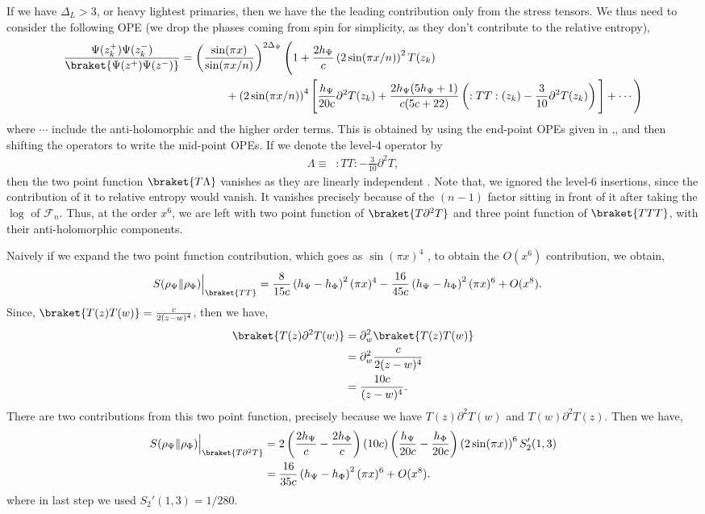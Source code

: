 \documentclass[11pt]{article}
\newcommand{\p}{\partial}
\newcommand{\nn}{\nonumber}
\newcommand{\lb}{\left(}
\newcommand{\rb}{\right)}
\begin{document}
If we have $\Delta_L>3$, or heavy lightest primaries, then we have the the leading contribution only from the stress tensors. We thus need to consider the following OPE (we drop the phases coming from spin for simplicity, as they don't contribute to the relative entropy),
\begin{align}
    \frac{\Psi(z_k^+) \Psi(z_k^-)}{\braket{\Psi(z^+) \Psi(z^-)}} &= \lb\frac{\sin(\pi x)}{\sin(\pi x/n)}\rb^{2\Delta_\Psi} \Bigg(1+ \frac{2h_\Psi}{c} \lb 2\sin (\pi x/n)\rb^2 T(z_k) \nn\\
    &\qquad\qquad  + \lb 2\sin (\pi x/n)\rb^4\Bigg[\frac{h_\Psi}{20c}\p^2T(z_k) + \frac{2h_\Psi(5h_\Psi+1)}{c(5c+22)}\lb :TT:(z_k) - \frac{3}{10}\p^2T(z_k)\rb\Bigg] + \cdots \Bigg)
\end{align}
where $\cdots$ include the anti-holomorphic and the higher order terms. This is obtained by using the end-point OPEs given in \cite{Zamolodchikov:1985wn},\cite{Mathieu_2007}, and then shifting the operators to write the mid-point OPEs. If we denote the level-4 operator by
\begin{align}
    \Lambda  \equiv \,\,\, :TT: - \frac{3}{10}\p^2T,
\end{align}
then the two point function $\braket{T\Lambda}$ vanishes as they are linearly independent \cite{Chen_2014}. Note that, we ignored the level-6 insertions, since the contribution of it to relative entropy would vanish. It vanishes precisely because of the $(n-1)$ factor sitting in front of it after taking the $\log$ of $\mathcal{F}_n$. Thus, at the order $x^6$, we are left with two point function of $\braket{T \p^2 T}$ and three point function of $\braket{TTT}$, with their anti-holomorphic components. 

Naively if we expand the two point function contribution, which goes as $\sin(\pi x)^4$ , to obtain the $O(x^6)$ contribution, we obtain,
\begin{align}
    S(\rho_\Psi \| \rho_\Phi)\Big|_{\braket{TT}}&= \frac{8}{15c}\lb h_\Psi - h_\Phi\rb^2(\pi x)^4 -\frac{16}{45c}\lb h_\Psi - h_\Phi\rb^2(\pi x)^6 + O(x^8).
\end{align}
Since, $\braket{T(z)T(w)} = \frac{c}{2(z-w)^4}$, then we have,
\begin{align}
    \braket{T(z)\p^2T(w)} &= \p^2_w \braket{T(z)T(w)} \\
    &= \p^2_w \frac{c}{2(z-w)^4}\\
    &=\frac{10c}{(z-w)^4}.
\end{align}
There are two contributions from this two point function, precisely because we have $T(z)\p^2T(w)$ and $T(w) \p^2T(z)$. Then we have,
\begin{align}
    S(\rho_\Psi \| \rho_\Phi) \Big|_{\braket{T\p^2T}} &= 2 \lb \frac{2h_\Psi}{c}-\frac{2h_\Phi}{c}\rb \lb 10c\rb \lb \frac{h_\Psi}{20c} - \frac{h_\Phi}{20c}\rb \lb2\sin (\pi x)\rb^6 S_2'(1,3)\\
    &= \frac{16}{35c}\lb h_\Psi - h_\Phi\rb^2 (\pi x)^6 + O(x^8).
\end{align}
where in last step we used $S_2'(1,3) = 1/280$. 
\end{document}
